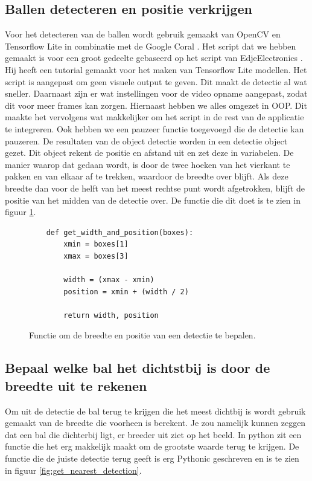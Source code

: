 \subsection{Ballen detecteren en positie verkrijgen}
Voor het detecteren van de ballen wordt gebruik gemaakt van OpenCV \cite{OpenCV} en Tensorflow Lite \cite{Tensorflow-Lite} in combinatie met de Google Coral \cite{Google-Coral}. Het script dat we hebben gemaakt is voor een groot gedeelte gebaseerd op het script van EdjeElectronics \cite{EdjeElectronics}. Hij heeft een tutorial gemaakt voor het maken van Tensorflow Lite modellen. Het script is aangepast om geen visuele output te geven. Dit maakt de detectie al wat sneller. Daarnaast zijn er wat instellingen voor de video opname aangepast, zodat dit voor meer frames kan zorgen. Hiernaast hebben we alles omgezet in OOP. Dit maakte het vervolgens wat makkelijker om het script in de rest van de applicatie te integreren. Ook hebben we een pauzeer functie toegevoegd die de detectie kan pauzeren. De resultaten van de object detectie worden in een detectie object gezet. Dit object rekent de positie en afstand uit en zet deze in variabelen. De manier waarop dat gedaan wordt, is door de twee hoeken van het vierkant te pakken en van elkaar af te trekken, waardoor de breedte over blijft. Als deze breedte dan voor de helft van het meest rechtse punt wordt afgetrokken, blijft de positie van het midden van de detectie over. De functie die dit doet is te zien in figuur \ref{fig:get_width_and_position}.\\ 

\begin{figure}[H]
    \centering
    \begin{verbatim}
    def get_width_and_position(boxes):
        xmin = boxes[1]
        xmax = boxes[3]
    
        width = (xmax - xmin)
        position = xmin + (width / 2)
    
        return width, position
    \end{verbatim}
    \caption{Functie om de breedte en positie van een detectie te bepalen.}
    \label{fig:get_width_and_position}
\end{figure}

\subsection{Bepaal welke bal het dichtstbij is door de breedte uit te rekenen}
Om uit de detectie de bal terug te krijgen die het meest dichtbij is wordt gebruik gemaakt van de breedte die voorheen is berekent. Je zou namelijk kunnen zeggen dat een bal die dichterbij ligt, er breeder uit ziet op het beeld. In python zit een functie die het erg makkelijk maakt om de grootste waarde terug te krijgen. De functie die de juiste detectie terug geeft is erg Pythonic geschreven en is te zien in figuur \ref{fig:get_nearest_detection}.\\

